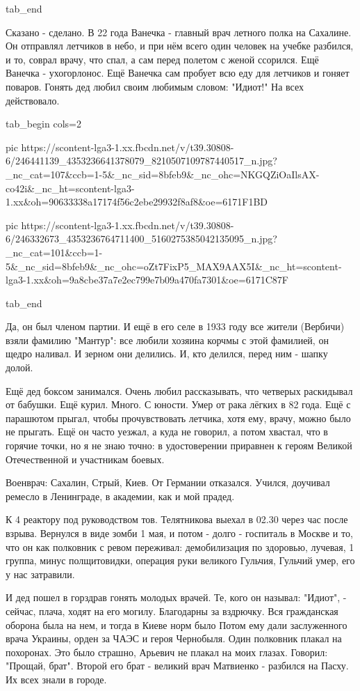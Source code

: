   tab_end
\fi

Сказано - сделано. В 22 года Ванечка - главный врач летного полка на Сахалине.
Он отправлял летчиков в небо, и при нём всего один человек на учебке разбился,
и то, соврал врачу, что спал, а сам перед полетом с женой ссорился. Ещё Ванечка
- ухогорлонос. Ещё Ванечка сам пробует всю еду для летчиков и гоняет поваров.
Гонять дед любил своим любимым словом: "Идиот!" На всех действовало. 

\ifcmt
  tab_begin cols=2

     pic https://scontent-lga3-1.xx.fbcdn.net/v/t39.30808-6/246441139_4353236641378079_8210507109787440517_n.jpg?_nc_cat=107&ccb=1-5&_nc_sid=8bfeb9&_nc_ohc=NKGQZiOaIlsAX-co42i&_nc_ht=scontent-lga3-1.xx&oh=90633338a17174f56c2ebe29932f8af8&oe=6171F1BD

     pic https://scontent-lga3-1.xx.fbcdn.net/v/t39.30808-6/246332673_4353236764711400_5160275385042135095_n.jpg?_nc_cat=101&ccb=1-5&_nc_sid=8bfeb9&_nc_ohc=oZt7FixP5_MAX9AAX5I&_nc_ht=scontent-lga3-1.xx&oh=9a8cbe37a7e2ec799e7b09a470fa7301&oe=6171C87F

  tab_end
\fi

Да, он был членом партии. И ещё в его селе в 1933 году все жители (Вербичи)
взяли фамилию "Мантур": все любили хозяина корчмы с этой фамилией, он щедро
наливал. И зерном они делились. И, кто делился, перед ним - шапку долой. 

Ещё дед боксом занимался. Очень любил рассказывать, что четверых раскидывал от
бабушки. Ещё курил. Много. С юности. Умер от рака лёгких в 82 года. Ещё с
парашютом прыгал, чтобы прочувствовать летчика, хотя ему, врачу, можно было не
прыгать. Ещё он часто уезжал, а куда не говорил, а потом хвастал, что в горячие
точки, но я не знаю точно: в удостоверении приравнен к героям Великой
Отечественной и участникам боевых.

Военврач: Сахалин, Стрый, Киев. От Германии отказался. Учился, доучивал ремесло
в Ленинграде, в академии, как и мой прадед.

 К 4 реактору под руководством тов. Телятникова выехал в 02.30 через час после
 взрыва. Вернулся в виде зомби 1 мая, и потом - долго - госпиталь в Москве и
 то, что он как полковник с ревом переживал: демобилизация по здоровью,
 лучевая, 1 группа, минус полщитовидки, операция руки великого Гульчия, Гульчий
 умер, его у нас затравили. 

И дед пошел в горздрав гонять молодых врачей. Те, кого он называл: "Идиот", -
сейчас, плача, ходят на его могилу. Благодарны за вздрючку. Вся гражданская
оборона была на нем, и тогда в Киеве норм было  Потом ему дали заслуженного
врача Украины, орден за ЧАЭС и героя Чернобыля. Один полковник плакал на
похоронах. Это было страшно, Арьевич не плакал на моих глазах. Говорил:
"Прощай, брат". Второй его брат - великий врач Матвиенко - разбился на Пасху.
Их всех знали в городе.


